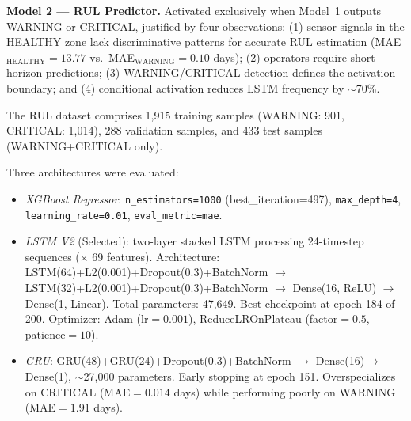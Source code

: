 \documentclass[conference]{IEEEtran}
\begin{document}

\textbf{Model 2 --- RUL Predictor.}
Activated exclusively when Model~1 outputs WARNING or CRITICAL, justified by
four observations: (1) sensor signals in the HEALTHY zone lack discriminative
patterns for accurate RUL estimation (MAE$_\text{HEALTHY}=13.77$ vs.\
MAE$_\text{WARNING}=0.10$ days); (2) operators require short-horizon
predictions; (3) WARNING/CRITICAL detection defines the activation boundary;
and (4) conditional activation reduces LSTM frequency by $\sim$70\%.

The RUL dataset comprises 1,915 training samples (WARNING: 901, CRITICAL:
1,014), 288 validation samples, and 433 test samples (WARNING+CRITICAL only).

Three architectures were evaluated:

\begin{itemize}
\item \textit{XGBoost Regressor}: \texttt{n\_estimators=1000}
  (best\_iteration=497), \texttt{max\_depth=4}, \texttt{learning\_rate=0.01},
  \texttt{eval\_metric=mae}.

\item \textit{LSTM V2} (Selected): two-layer stacked LSTM processing
  24-timestep sequences ($\times$ 69 features). Architecture:
  LSTM(64)+L2(0.001)+Dropout(0.3)+BatchNorm $\rightarrow$
  LSTM(32)+L2(0.001)+Dropout(0.3)+BatchNorm $\rightarrow$
  Dense(16, ReLU) $\rightarrow$ Dense(1, Linear).
  Total parameters: 47,649. Best checkpoint at epoch 184 of 200.
  Optimizer: Adam (lr$=0.001$), ReduceLROnPlateau (factor$=0.5$,
  patience$=10$).

\item \textit{GRU}: GRU(48)+GRU(24)+Dropout(0.3)+BatchNorm $\rightarrow$
  Dense(16)$\rightarrow$Dense(1), $\sim$27,000 parameters. Early stopping
  at epoch 151. Overspecializes on CRITICAL (MAE$=0.014$ days) while
  performing poorly on WARNING (MAE$=1.91$ days).
\end{itemize}
\end{document}
